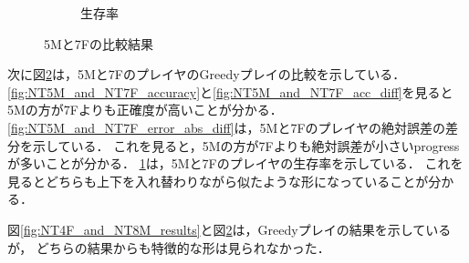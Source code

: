 \begin{figure}[t]
\begin{subfigure}[b]{0.8\linewidth}
    \caption{生存率}
    \label{fig:NT5M_and_NT7F_survival}
\end{subfigure}
\caption{5Mと7Fの比較結果}
\label{fig:NT5M_and_NT7F_results}
\end{figure}

次に図\ref{fig:NT5M_and_NT7F_results}は，5Mと7FのプレイヤのGreedyプレイの比較を示している．
\ref{fig:NT5M_and_NT7F_accuracy}と\ref{fig:NT5M_and_NT7F_acc_diff}を見ると
5Mの方が7Fよりも正確度が高いことが分かる．
\ref{fig:NT5M_and_NT7F_error_abs_diff}は，5Mと7Fのプレイヤの絶対誤差の差分を示している．
これを見ると，5Mの方が7Fよりも絶対誤差が小さいprogressが多いことが分かる．
\ref{fig:NT5M_and_NT7F_survival}は，5Mと7Fのプレイヤの生存率を示している．
これを見るとどちらも上下を入れ替わりながら似たような形になっていることが分かる．

図\ref{fig:NT4F_and_NT8M_results}と図\ref{fig:NT5M_and_NT7F_results}は，Greedyプレイの結果を示しているが，
どちらの結果からも特徴的な形は見られなかった．
    
